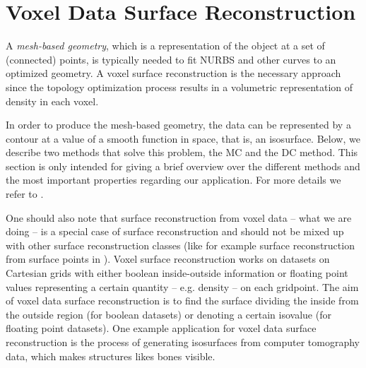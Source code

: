\section{Voxel Data Surface Reconstruction}
\label{sec:surfaceBackg}
A \emph{mesh-based geometry}, which is a representation of the object at a set of (connected) points, is typically needed to fit \ac{NURBS} and other curves to an optimized geometry. A voxel surface reconstruction is the necessary approach since the topology optimization process results in a volumetric representation of density in each voxel. 

In order to produce the mesh-based geometry, the data can be represented by a contour at a value of a smooth function in space, that is, an isosurface. Below, we describe two methods that solve this problem, the \acl{MC} and the \acl{DC} method. This section is only intended for giving a brief overview over the different methods and the most important properties regarding our application. For more details we refer to \cite{Marching2006, Hermite2002}. 

One should also note that surface reconstruction from voxel data -- what we are doing -- is a special case of surface reconstruction and should not be mixed up with other surface reconstruction classes (like for example surface reconstruction from surface points in \cite{eck1996automatic}). Voxel surface reconstruction works on datasets on Cartesian grids with either boolean inside-outside information or floating point values representing a certain quantity -- e.g. density -- on each gridpoint. The aim of voxel data surface reconstruction is to find the surface dividing the inside from the outside region (for boolean datasets) or denoting a certain isovalue (for floating point datasets). One example application for voxel data surface reconstruction is the process of generating isosurfaces from computer tomography data, which makes structures likes bones visible.




